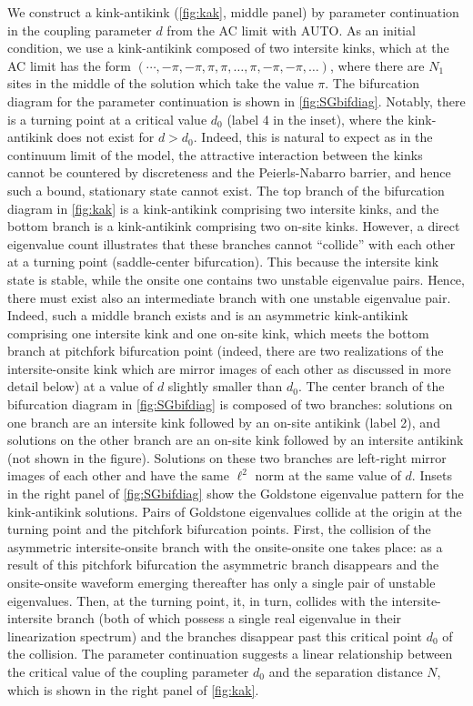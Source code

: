 \documentclass[12pt,reqno]{amsart}
\begin{document}
We construct a kink-antikink (\cref{fig:kak}, middle panel) by parameter continuation in the coupling parameter $d$ from the AC limit with AUTO. As an initial condition, we use a kink-antikink composed of two intersite kinks, which at the AC limit has the form $(\cdots, -\pi, -\pi, \pi, \pi, \dots, \pi, -\pi, -\pi, \dots )$, where there are $N_1$ sites in the middle of the solution which take the value $\pi$. The bifurcation diagram for the parameter continuation is shown in \cref{fig:SGbifdiag}. Notably, there is a turning point at a critical value $d_0$ (label 4 in the inset), where the kink-antikink does not exist for $d > d_0$. 
Indeed, this is natural to expect as in the continuum
limit of the model, the attractive interaction between the
kinks~\cite{MANTON1979397} 
cannot be countered by discreteness and the
Peierls-Nabarro barrier, and hence such a bound, stationary
state cannot exist. 
The top branch of the bifurcation diagram in \cref{fig:kak} is a kink-antikink comprising two intersite kinks, and the bottom branch is a kink-antikink comprising two on-site kinks. 
However, a direct eigenvalue count illustrates that
these branches cannot ``collide'' with each other
at a turning point (saddle-center bifurcation). This
because the intersite kink state is stable, while the
onsite one contains two unstable eigenvalue pairs. Hence,
there must exist also an intermediate branch with one
unstable eigenvalue pair.
Indeed, such a  middle branch exists and is an asymmetric kink-antikink comprising one intersite kink and one on-site kink, which meets the bottom branch at pitchfork bifurcation point 
(indeed, there are two realizations of the 
intersite-onsite kink which are mirror images of each other as
discussed in more detail below) at a value of $d$ slightly smaller than $d_0$. The center branch of the bifurcation diagram in \cref{fig:SGbifdiag} is composed of two branches: solutions on one branch are an intersite kink followed by an on-site antikink (label 2), and solutions on the other branch are an on-site kink followed by an intersite antikink (not shown in the figure). Solutions on these two branches are left-right mirror images of each other and have the same $\ell^2$ norm at the same value of $d$. Insets in the right panel of \cref{fig:SGbifdiag} show the Goldstone eigenvalue pattern for the kink-antikink solutions. Pairs of Goldstone eigenvalues collide at the origin at the turning point and the pitchfork bifurcation points. 
First, the collision of the asymmetric intersite-onsite
branch with the onsite-onsite one takes place: as a result
of this pitchfork bifurcation the asymmetric branch disappears
and the onsite-onsite waveform emerging thereafter has only
a single pair of unstable eigenvalues. Then, at the turning point,
it, in turn, collides with the intersite-intersite branch (both
of which possess a single real eigenvalue in their linearization
spectrum) and the branches disappear past this critical
point $d_0$ of the collision.
The parameter continuation suggests a linear relationship between the critical value of the coupling parameter $d_0$ and the separation distance $N$, which is shown in the right panel of  \cref{fig:kak}.
\end{document}
